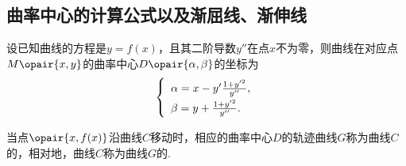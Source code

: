 \subsection{曲率中心的计算公式以及渐屈线、渐伸线}
设已知曲线的方程是\(y=f(x)\)，且其二阶导数\(y''\)在点\(x\)不为零，则曲线在对应点\(M\opair{x,y}\)的曲率中心\(D\opair{\alpha,\beta}\)的坐标为\begin{equation}
\left\{ \def\arraystretch{1.5} \begin{array}{l}
\alpha = x - y' \frac{1 + y'^2}{y''}, \\
\beta = y + \frac{1 + y'^2}{y''}.
\end{array} \right.
\end{equation}

当点\(\opair{x,f(x)}\)沿曲线\(C\)移动时，相应的曲率中心\(D\)的轨迹曲线\(G\)称为曲线\(C\)的，相对地，曲线\(C\)称为曲线\(G\)的.
